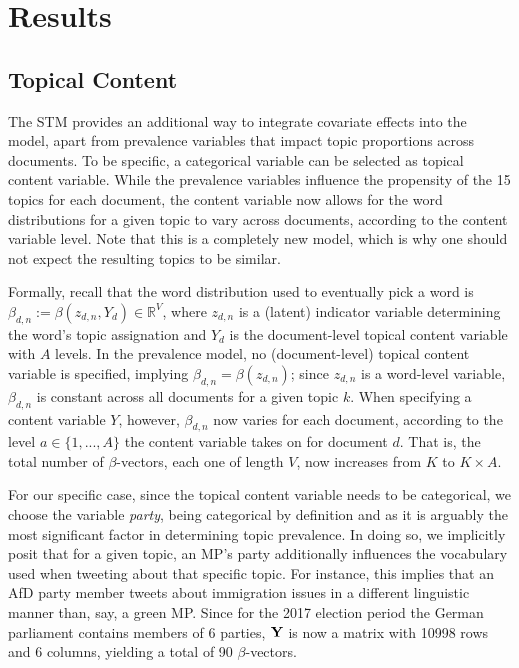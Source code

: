 \documentclass[12pt]{article}
\begin{document}
\section{Results}

\subsection{Topical Content}

The STM provides an additional way to integrate covariate effects into the model, apart from prevalence variables that impact topic proportions across documents. To be specific, a categorical variable can be selected as topical content variable. While the prevalence variables influence the propensity of the 15 topics for each document, the content variable now allows for the word distributions for a given topic to vary across documents, according to the content variable level. Note that this is a completely new model, which is why one should not expect the resulting topics to be similar. 

Formally, recall that the word distribution used to eventually pick a word is $\beta_{d,n} := \beta(z_{d,n}, Y_d) \in \mathbb{R}^V$, where $z_{d,n}$ is a (latent) indicator variable determining the word's topic assignation and $Y_{d}$ is the document-level topical content variable with $A$ levels. In the prevalence model, no (document-level) topical content variable is specified, implying $\beta_{d,n} = \beta(z_{d,n})$; since $z_{d,n}$ is a word-level variable, $\beta_{d,n}$ is constant across all documents for a given topic $k$. When specifying a content variable $Y$, however, $\beta_{d,n}$ now varies for each document, according to the level $a \in \{1, ..., A\}$ the content variable takes on for document $d$. That is, the total number of $\beta$-vectors, each one of length $V$, now increases from $K$ to $K \times A$.

For our specific case, since the topical content variable needs to be categorical, we choose the variable \textit{party}, being categorical by definition and as it  is arguably the most significant factor in determining topic prevalence. In doing so, we implicitly posit that for a given topic, an MP's party additionally influences the vocabulary used when tweeting about that specific topic. For instance, this implies that an AfD party member tweets about immigration issues in a different linguistic manner than, say, a green MP. Since for the 2017 election period the German parliament contains members of 6 parties, $\bf{Y}$ is now a matrix with 10998 rows and 6 columns, yielding a total of 90 $\beta$-vectors.
\end{document}

